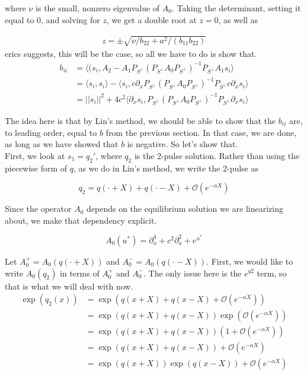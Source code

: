 \documentclass[12pt]{article}
\begin{document}
where $\nu$ is the small, nonzero eigenvalue of $A_0$. Taking the determinant, setting it equal to 0, and solving for $z$, we get a double root at $z = 0$, as well as

\begin{align*}
z = \pm \sqrt{\nu /b_{22} + a^2/(b_{11} b_{22})}
\end{align*} erics suggests, this will be the case, so all we have to do is show that.\\

\begin{align*}
b_{ii} &= \langle(s_i, A_2 - A_1 P_{S^\perp} (P_{S^\perp} A_0 P_{S^\perp})^{-1} P_{S^\perp} A_1 s_i \rangle \\
&= \langle s_i, s_i \rangle - \langle s_i, c \partial_x P_{S^\perp} (P_{S^\perp} A_0 P_{S^\perp})^{-1} P_{S^\perp} c \partial_x  s_i \rangle \\
&= ||s_i||^2 + 4 c^2 \langle \partial_x s_i, P_{S^\perp} (P_{S^\perp} A_0 P_{S^\perp})^{-1} P_{S^\perp} \partial_x s_i \rangle
\end{align*}

The idea here is that by Lin's method, we should be able to show that the $b_{ii}$ are, to leading order, equal to $b$ from the previous section. In that case, we are done, as long as we have showed that $b$ is negative. So let's show that.\\

First, we look at $s_1 = q_2'$, where $q_2$ is the 2-pulse solution. Rather than using the piecewise form of $q$, as we do in Lin's method, we write the 2-pulse as

\[
q_2 = q(\cdot + X) + q(\cdot - X) + \mathcal{O}(e^{-\alpha X})
\]

Since the operator $A_0$ depends on the equilibrium solution we are linearizing about, we make that dependency explicit.

\begin{equation}
A_0(u^*) = \partial_x^4 + c^2 \partial_x^2 + e^{u^*}
\end{equation}

Let $A_0^+ = A_0(q(\cdot + X))$ and $A_0^- = A_0(q(\cdot - X))$. First, we would like to write $A_0(q_2)$ in terms of $A_0^+$ and $A_0^-$. The only issue here is the $e^{q2}$ term, so that is what we will deal with now.\\

\begin{align*}
\exp(q_2(x)) &= \exp( q(x + X) + q(x - X) + \mathcal{O}(e^{-\alpha X}) ) \\
&= \exp( q(x + X) + q(x - X)) \exp( \mathcal{O}(e^{-\alpha X}) )\\
&= \exp( q(x + X) + q(x - X)) (1 + \mathcal{O}(e^{-\alpha X})) \\
&= \exp( q(x + X) + q(x - X)) + \mathcal{O}(e^{-\alpha X}) \\
&= \exp( q(x + X))\exp(q(x - X)) + \mathcal{O}(e^{-\alpha X})
\end{align*}
\end{document}
